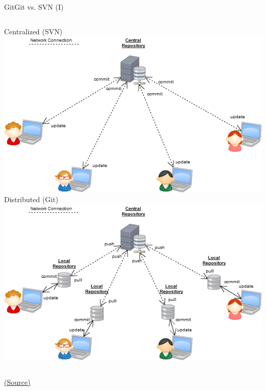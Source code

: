 \documentclass{beamer}
\begin{document}
\begin{frame}{Git}{Git vs. SVN (I)}
\begin{center}
\begin{columns}
	\centering Centralized (SVN)\\\smallskip
\includegraphics[width=\linewidth]{figs/centralized.png}
	\centering Distributed (Git)\\\smallskip
\includegraphics[width=\linewidth]{figs/distributed.png}
\end{columns}

\tiny \href{http://softwareengineering.stackexchange.com/questions/35074/im-a-subversion-geek-why-should-i-consider-or-not-consider-mercurial-or-git-or}{(Source)}
\end{center}
\end{frame}
\end{document}
